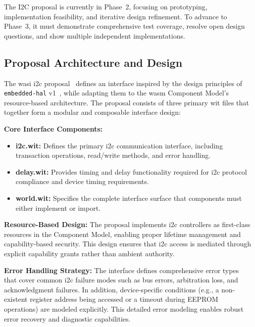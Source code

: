 The I2C proposal is currently in Phase~2, focusing on prototyping, implementation feasibility, and iterative design refinement. To advance to Phase~3, it must demonstrate comprehensive test coverage, resolve open design questions, and show multiple independent implementations.

\subsection{Proposal Architecture and Design}
\label{subsec:i2c-proposal-design}

The \acrshort{wasi} \acrshort{i2c} proposal~\cite{wasi_i2c_proposal} defines an interface inspired by the design principles of \texttt{embedded-hal} v1~\cite{hal}, while adapting them to the \acrshort{wasm} Component Model's resource-based architecture. The proposal consists of three primary \acrshort{wit} files that together form a modular and composable interface design:

\textbf{Core Interface Components:}
\begin{itemize}
    \item \textbf{i2c.wit:} Defines the primary \acrshort{i2c} communication interface, including transaction operations, read/write methods, and error handling.
    \item \textbf{delay.wit:} Provides timing and delay functionality required for \acrshort{i2c} protocol compliance and device timing requirements.
    \item \textbf{world.wit:} Specifies the complete interface surface that components must either implement or import.
\end{itemize}

\textbf{Resource-Based Design:} The proposal implements \acrshort{i2c} controllers as first-class resources in the Component Model, enabling proper lifetime management and capability-based security. This design ensures that \acrshort{i2c} access is mediated through explicit capability grants rather than ambient authority.

\textbf{Error Handling Strategy:} The interface defines comprehensive error types that cover common \acrshort{i2c} failure modes such as bus errors, arbitration loss, and acknowledgment failures. In addition, device-specific conditions (e.g., a non-existent register address being accessed or a timeout during EEPROM operations) are modeled explicitly. This detailed error modeling enables robust error recovery and diagnostic capabilities.

